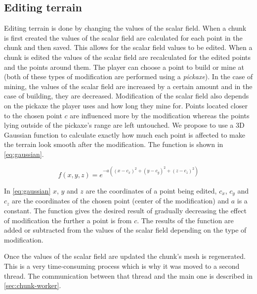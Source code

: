 \subsection{Editing terrain} \label{sec:terrain_editing}
Editing terrain is done by changing the values of the scalar field.
When a chunk is first created the values of the scalar field are calculated for each point in the chunk and then saved.
This allows for the scalar field values to be edited.
When a chunk is edited the values of the scalar field are recalculated for the edited points and the points around them.
The player can choose a point to build or mine at (both of these types of modification are performed using a \textit{pickaxe}).
In the case of mining, the values of the scalar field are increased by a certain amount and in the case of building, they are decreased.
Modification of the scalar field also depends on the pickaxe the player uses and how long they mine for.
Points located closer to the chosen point $c$ are influenced more by the modification whereas the points lying outside of the pickaxe's range are left untouched.
We propose to use a 3D Gaussian function to calculate exactly how much each point is affected to make the terrain look smooth after the modification.
The function is shown in \autoref{eq:gaussian}.

\begin{equation}
    \label{eq:gaussian}
    f(x, y, z) = e^{-a \left((x - c_x)^2 + (y - c_y)^2 + (z - c_z)^2\right)}
\end{equation}

In \autoref{eq:gaussian} $x$, $y$ and $z$ are the coordinates of a point being edited, $c_x$, $c_y$ and $c_z$ are the coordinates of the chosen point (center of the modification) and $a$ is a constant.
The function gives the desired result of gradually decreasing the effect of modification the further a point is from $c$.
The results of the function are added or subtracted from the values of the scalar field depending on the type of modification.

Once the values of the scalar field are updated the chunk's mesh is regenerated.
This is a very time-consuming process which is why it was moved to a second thread.
The communication between that thread and the main one is described in \autoref{sec:chunk-worker}.